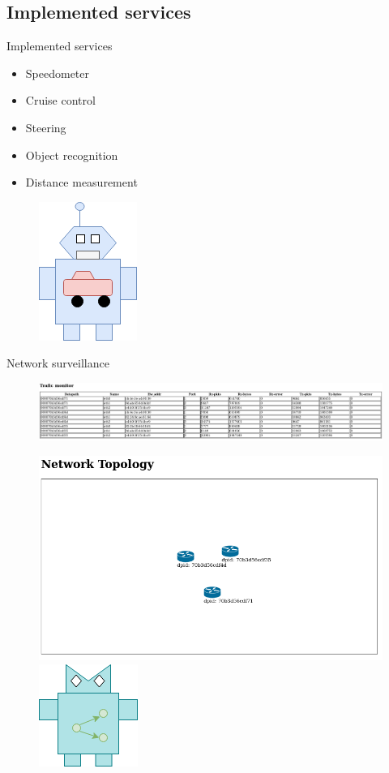 \documentclass{beamer}
\begin{document}

\subsection{Implemented services}
\begin{frame}{Implemented services}
    \begin{itemize}
        \item Speedometer
        \item Cruise control
        \item Steering
        \item Object recognition
        \item Distance measurement
    \end{itemize}
    \begin{figure}
        \includegraphics[width=0.2\linewidth]{robocar.png}
    \end{figure}
\end{frame}

\begin{frame}{Network surveillance}
    \begin{figure}
        \includegraphics[width=1.05\linewidth]{netstat1.png}
    \end{figure}
    \begin{figure}
        \includegraphics[width=0.6\linewidth]{netstat2.png}
        \includegraphics[width=0.2\linewidth]{robonet.png}
    \end{figure}
\end{frame}
\end{document}
